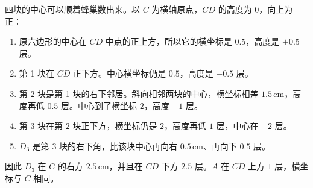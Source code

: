 \documentclass[11pt,a4paper,fontset=none]{ctexart}
\begin{document}
四块的中心可以顺着蜂巢数出来。以 \(C\) 为横轴原点，\(CD\) 的高度为 \(0\)，向上为正：

\begin{enumerate}[leftmargin=1.7em,itemsep=0.32em]
  \item 原六边形的中心在 \(CD\) 中点的正上方，所以它的横坐标是 \(0.5\)，高度是 \(+0.5\) 层。
  \item 第 1 块在 \(CD\) 正下方。中心横坐标仍是 \(0.5\)，高度是 \(-0.5\) 层。
  \item 第 2 块是第 1 块的右下邻居。斜向相邻两块的中心，横坐标相差 \(1.5\,\mathrm{cm}\)，高度再低 \(0.5\) 层。中心到了横坐标 \(2\)，高度 \(-1\) 层。
  \item 第 3 块在第 2 块正下方，横坐标仍是 \(2\)，高度再低 \(1\) 层，中心在 \(-2\) 层。
  \item \(D_3\) 是第 3 块的右下角，比该块中心再向右 \(0.5\,\mathrm{cm}\)、再向下 \(0.5\) 层。
\end{enumerate}

因此 \(D_3\) 在 \(C\) 的右方 \(2.5\,\mathrm{cm}\)，并且在 \(CD\) 下方 \(2.5\) 层。\(A\) 在 \(CD\) 上方 \(1\) 层，横坐标与 \(C\) 相同。
\end{document}

